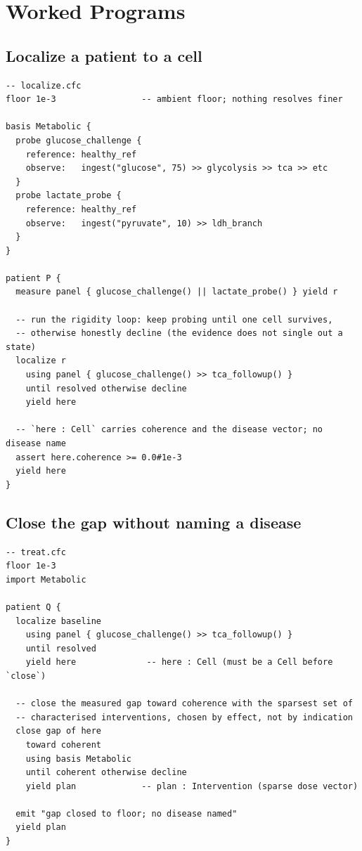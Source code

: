 \documentclass[11pt,a4paper]{article}
\theoremstyle{cfcthm}
\theoremstyle{definition}
\theoremstyle{remark}
\begin{document}
\section{Worked Programs}
\label{sec:examples}

\subsection{Localize a patient to a cell}

\begin{lstlisting}[caption={Diagnosis is localization to a cell, never a label.}]
-- localize.cfc
floor 1e-3                 -- ambient floor; nothing resolves finer

basis Metabolic {
  probe glucose_challenge {
    reference: healthy_ref
    observe:   ingest("glucose", 75) >> glycolysis >> tca >> etc
  }
  probe lactate_probe {
    reference: healthy_ref
    observe:   ingest("pyruvate", 10) >> ldh_branch
  }
}

patient P {
  measure panel { glucose_challenge() || lactate_probe() } yield r

  -- run the rigidity loop: keep probing until one cell survives,
  -- otherwise honestly decline (the evidence does not single out a state)
  localize r
    using panel { glucose_challenge() >> tca_followup() }
    until resolved otherwise decline
    yield here

  -- `here : Cell` carries coherence and the disease vector; no disease name
  assert here.coherence >= 0.0#1e-3
  yield here
}
\end{lstlisting}

\subsection{Close the gap without naming a disease}

\begin{lstlisting}[caption={Therapy is gap-closure to the coherent set.}]
-- treat.cfc
floor 1e-3
import Metabolic

patient Q {
  localize baseline
    using panel { glucose_challenge() >> tca_followup() }
    until resolved
    yield here              -- here : Cell (must be a Cell before `close`)

  -- close the measured gap toward coherence with the sparsest set of
  -- characterised interventions, chosen by effect, not by indication
  close gap of here
    toward coherent
    using basis Metabolic
    until coherent otherwise decline
    yield plan             -- plan : Intervention (sparse dose vector)

  emit "gap closed to floor; no disease named"
  yield plan
}
\end{lstlisting}
\end{document}
